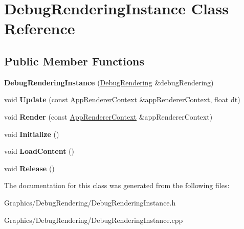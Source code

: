 \hypertarget{classDebugRenderingInstance}{}\section{Debug\+Rendering\+Instance Class Reference}
\label{classDebugRenderingInstance}
\subsection*{Public Member Functions}
\begin{DoxyCompactItemize}
\item 
\mbox{\label{classDebugRenderingInstance_ad0a7f7c1835296c93c888f899e54d181}} 
{\bfseries Debug\+Rendering\+Instance} (\hyperlink{classDebugRendering}{Debug\+Rendering} \&debug\+Rendering)
\item 
\mbox{\label{classDebugRenderingInstance_a10ae7e020d9cbf96a0f75c51a4e1ca92}} 
void {\bfseries Update} (const \hyperlink{structAppRendererContext}{App\+Renderer\+Context} \&app\+Renderer\+Context, float dt)
\item 
\mbox{\label{classDebugRenderingInstance_ab5ba2696c823b156cc41fa41480b6076}} 
void {\bfseries Render} (const \hyperlink{structAppRendererContext}{App\+Renderer\+Context} \&app\+Renderer\+Context)
\item 
\mbox{\label{classDebugRenderingInstance_a5fa8f530c75e15869550bdf8d6814302}} 
void {\bfseries Initialize} ()
\item 
\mbox{\label{classDebugRenderingInstance_ace67dea54e2b930f9c3a0faabf154163}} 
void {\bfseries Load\+Content} ()
\item 
\mbox{\label{classDebugRenderingInstance_a02154ca8f49fa0e80900e4e05f4a48e9}} 
void {\bfseries Release} ()
\end{DoxyCompactItemize}


The documentation for this class was generated from the following files\+:\begin{DoxyCompactItemize}
\item 
Graphics/\+Debug\+Rendering/Debug\+Rendering\+Instance.\+h\item 
Graphics/\+Debug\+Rendering/Debug\+Rendering\+Instance.\+cpp\end{DoxyCompactItemize}
